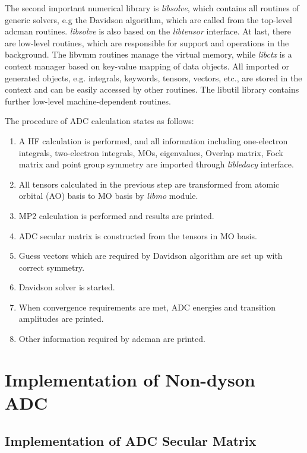 The second important numerical library is \emph{libsolve}, which contains all routines of
generic solvers, e.g the Davidson algorithm, which are called from the top-level adcman
routines. \emph{libsolve} is also based on the \emph{libtensor} interface. At last, there are low-level
routines, which are responsible for support and operations in the background. The libvmm
routines manage the virtual memory, while \emph{libctx} is a context manager based on key-value
mapping of data objects. All imported or generated objects, e.g. integrals, keywords,
tensors, vectors, etc., are stored in the context and can be easily accessed by other routines.
The libutil library contains further low-level machine-dependent routines.

The procedure of ADC calculation states as follows:
\begin{enumerate}
	\item A HF calculation is performed, and all information including one-electron integrals, two-electron integrals, MOs, eigenvalues, Overlap matrix, Fock matrix and point group symmetry are imported through \emph{libledacy} interface.
	\item All tensors calculated in the previous step are transformed from atomic orbital (AO) basis to MO basis by \emph{libmo} module.
	\item MP2 calculation is performed and results are printed.
	\item ADC secular matrix is constructed from the tensors in MO basis.
	\item Guess vectors which are required by Davidson algorithm are set up with correct symmetry.
	\item Davidson solver is started.
	\item When convergence requirements are met, ADC energies and transition amplitudes are printed.
	\item Other information required by adcman are printed.
\end{enumerate}

\section{Implementation of Non-dyson ADC}

\subsection{Implementation of ADC Secular Matrix}

